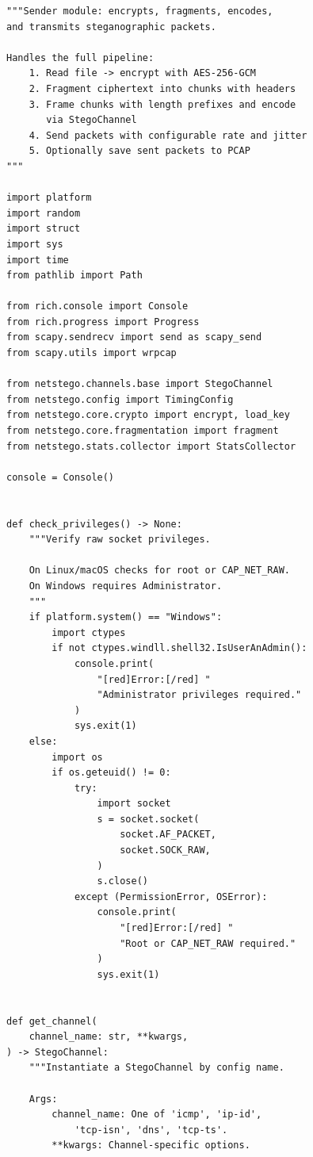 \begin{lstlisting}[style=appendixcode]
"""Sender module: encrypts, fragments, encodes,
and transmits steganographic packets.

Handles the full pipeline:
    1. Read file -> encrypt with AES-256-GCM
    2. Fragment ciphertext into chunks with headers
    3. Frame chunks with length prefixes and encode
       via StegoChannel
    4. Send packets with configurable rate and jitter
    5. Optionally save sent packets to PCAP
"""

import platform
import random
import struct
import sys
import time
from pathlib import Path

from rich.console import Console
from rich.progress import Progress
from scapy.sendrecv import send as scapy_send
from scapy.utils import wrpcap

from netstego.channels.base import StegoChannel
from netstego.config import TimingConfig
from netstego.core.crypto import encrypt, load_key
from netstego.core.fragmentation import fragment
from netstego.stats.collector import StatsCollector

console = Console()


def check_privileges() -> None:
    """Verify raw socket privileges.

    On Linux/macOS checks for root or CAP_NET_RAW.
    On Windows requires Administrator.
    """
    if platform.system() == "Windows":
        import ctypes
        if not ctypes.windll.shell32.IsUserAnAdmin():
            console.print(
                "[red]Error:[/red] "
                "Administrator privileges required."
            )
            sys.exit(1)
    else:
        import os
        if os.geteuid() != 0:
            try:
                import socket
                s = socket.socket(
                    socket.AF_PACKET,
                    socket.SOCK_RAW,
                )
                s.close()
            except (PermissionError, OSError):
                console.print(
                    "[red]Error:[/red] "
                    "Root or CAP_NET_RAW required."
                )
                sys.exit(1)


def get_channel(
    channel_name: str, **kwargs,
) -> StegoChannel:
    """Instantiate a StegoChannel by config name.

    Args:
        channel_name: One of 'icmp', 'ip-id',
            'tcp-isn', 'dns', 'tcp-ts'.
        **kwargs: Channel-specific options.


\end{lstlisting}
